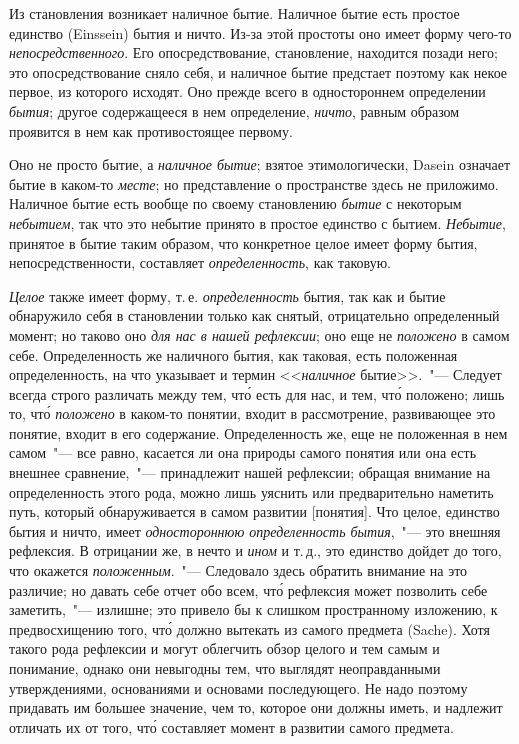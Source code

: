 Из становления возникает наличное бытие. Наличное
бытие есть простое единство (Einssein) бытия и ничто.
Из-за этой простоты оно имеет форму чего-то \emph{непосредственного}.
Его опосредствование, становление, находится
позади него; это опосредствование сняло себя, и наличное
бытие предстает поэтому как некое первое, из которого
исходят. Оно прежде всего в одностороннем определении
\emph{бытия}; другое содержащееся в нем определение,
\emph{ничто}, равным образом проявится в нем как противостоящее
первому.

Оно не просто бытие, а \emph{наличное бытие}; взятое этимологически,
Dasein означает бытие в каком-то \emph{месте}; но
представление о пространстве здесь не приложимо. Наличное
бытие есть вообще по своему становлению \emph{бытие}
с некоторым \emph{небытием}, так что это небытие принято в
простое единство с бытием. \emph{Небытие}, принятое в бытие
таким образом, что конкретное целое имеет форму бытия,
непосредственности, составляет \emph{определенность}, как таковую.

\emph{Целое} также имеет форму, т.\,е. \emph{определенность} бытия,
так как и бытие обнаружило себя в становлении только
как снятый, отрицательно определенный момент\endnotemark{}; но
таково оно \emph{для нас в нашей рефлексии}; оно еще не \emph{положено}
в самом себе. Определенность же наличного бытия,
как таковая, есть положенная определенность, на что
указывает и термин <<\emph{наличное} бытие>>.~"--- Следует всегда
строго различать между тем, чт\'о есть для нас, и тем,
чт\'о положено; лишь то, чт\'о \emph{положено} в каком-то понятии,
входит в рассмотрение, развивающее это понятие,
входит в его содержание. Определенность же, еще не положенная
в нем самом~"--- все равно, касается ли она
природы самого понятия или она есть внешнее сравнение,~"---
принадлежит нашей рефлексии; обращая внимание
на определенность этого рода, можно лишь уяснить
или предварительно наметить путь, который обнаруживается
в самом развитии [понятия]. Что целое, единство
бытия и ничто, имеет \emph{одностороннюю определенность
бытия},~"--- это внешняя рефлексия. В отрицании же, в
нечто и \emph{ином} и т.\,д., это единство дойдет до того, что
окажется \emph{положенным}.~"--- Следовало здесь обратить внимание
на это различие; но давать себе отчет обо всем,
чт\'о рефлексия может позволить себе заметить,~"--- излишне;
это привело бы к слишком пространному изложению,
к предвосхищению того, чт\'о должно вытекать из самого
предмета (Sache). Хотя такого рода рефлексии и могут
облегчить обзор целого и тем самым и понимание, однако
они невыгодны тем, что выглядят неоправданными
утверждениями, основаниями и основами последующего.
Не надо поэтому придавать им большее значение, чем то,
которое они должны иметь, и надлежит отличать их от
того, чт\'о составляет момент в развитии самого предмета.

